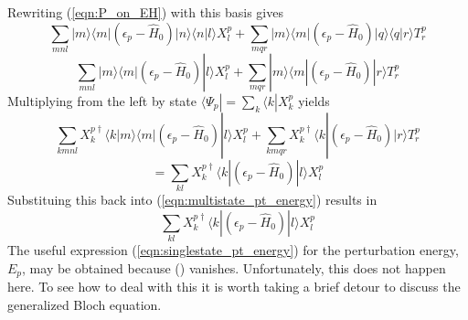 \documentclass[12pt]{article}
\begin{document}
\noindent Rewriting (\ref{eqn:P_on_EH}) with this basis gives
\begin{equation*}
\sum_{mnl}|m\rangle \langle m | (\epsilon_{p} - \hat{H}_{0})|n\rangle \langle n | l \rangle X_{l}^{p}
+ \sum_{mqr}|m\rangle \langle m | (\epsilon_{p} - \hat{H}_{0})|q\rangle \langle q | r \rangle T_{r}^{p}
\end{equation*}
\begin{equation*}
\sum_{mnl}|m\rangle \langle m | (\epsilon_{p} - \hat{H}_{0})   | l \rangle X_{l}^{p}
+ \sum_{mqr}|m\rangle \langle m | (\epsilon_{p} - \hat{H}_{0}) | r \rangle T_{r}^{p}
\label{eqn:P_on_EH_explicit_bas}
\end{equation*}
Multiplying from the left by state $\langle\Psi_{p}| = \sum_{k}\langle k | X_{k}^{p}$ yields
\begin{equation}
\sum_{kmnl}X^{p\dagger}_{k}\langle k | m\rangle \langle m | (\epsilon_{p} - \hat{H}_{0})   | l \rangle X_{l}^{p}
+ \sum_{kmqr}X^{p\dagger}_{k}\langle k | (\epsilon_{p} - \hat{H}_{0}) | r \rangle T_{r}^{p}
\end{equation}
\begin{equation}
=  \sum_{kl}X^{p\dagger}_{k}\langle k | (\epsilon_{p} - \hat{H}_{0}) | l \rangle X_{l}^{p}
\label{eqn:P_on_EH_ms_nondiag}
\end{equation}
Substituing this back into (\ref{eqn:multistate_pt_energy}) results in 
\begin{equation}
\sum_{kl}X^{p\dagger}_{k}\langle k | (\epsilon_{p} - \hat{H}_{0}) | l \rangle X_{l}^{p}
\label{eqn:multistate_PT_energy_nondiag}
\end{equation}
The useful expression (\ref{eqn:singlestate_pt_energy}) for the perturbation energy, $E_{p}$, 
may be obtained because (\label{eqn:P_on_EH_ms_nondiag}) vanishes. Unfortunately, this 
does not happen here. To see how to deal with this it is worth taking a brief detour to 
discuss the generalized Bloch equation.
\end{document}
